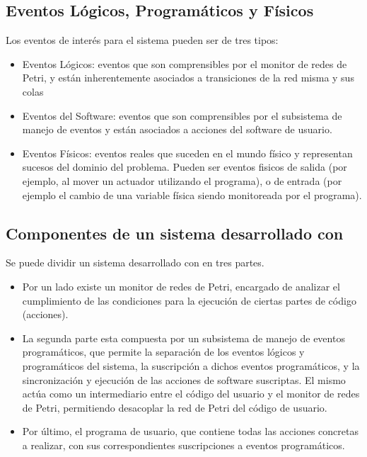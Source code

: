 \subsection{Eventos Lógicos, Programáticos y Físicos}
Los eventos de interés para el sistema pueden ser de tres tipos:
  \begin{itemize}
    \item Eventos Lógicos: eventos que son comprensibles por el monitor de
    redes de Petri, y están inherentemente asociados a transiciones de la red
    misma y sus colas
    \item Eventos del Software: eventos que son comprensibles por el
    subsistema de manejo de eventos y están asociados a acciones del
    software de usuario.
    \item Eventos Físicos: eventos reales que suceden en el mundo físico y
    representan sucesos del dominio del problema. Pueden ser eventos fisicos de
    salida (por ejemplo, al mover un actuador utilizando el programa), o de
    entrada (por ejemplo el cambio de una variable física siendo monitoreada por
    el programa).
  \end{itemize}
  
  
\subsection{Componentes de un sistema desarrollado con \nombreFramework}
Se puede dividir un sistema desarrollado con \nombreFramework en tres partes.
\begin{itemize}
\item Por un lado existe un monitor de redes de Petri, encargado de analizar el
cumplimiento de las condiciones para la ejecución de ciertas partes de código
(acciones). 
\item La segunda parte esta compuesta por un subsistema de manejo de eventos
programáticos, que permite la separación de los eventos lógicos y programáticos
del sistema, la suscripción a dichos eventos programáticos, y la sincronización
y ejecución de las acciones de software suscriptas. El mismo actúa como un
intermediario entre el código del usuario y el monitor de redes de Petri,
permitiendo desacoplar la red de Petri del código de usuario. 
\item Por último, el programa de usuario, que contiene todas las acciones
concretas a realizar, con sus correspondientes suscripciones a eventos
programáticos.
\end{itemize}
  
  
 
